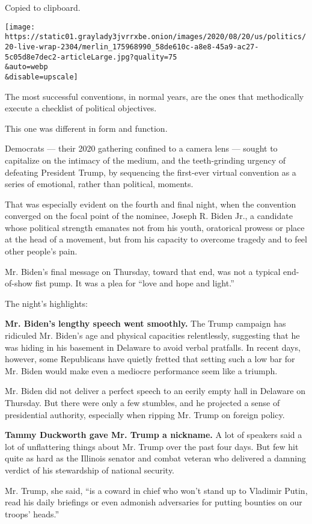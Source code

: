 Copied to clipboard.

\texttt{[image: https://static01.graylady3jvrrxbe.onion/images/2020/08/20/us/politics/20-live-wrap-2304/merlin\_175968990\_58de610c-a8e8-45a9-ac27-5c05d8e7dec2-articleLarge.jpg?quality=75\\\&auto=webp\\\&disable=upscale]}

The most successful conventions, in normal years, are the ones that
methodically execute a checklist of political objectives.

This one was different in form and function.

Democrats --- their 2020 gathering confined to a camera lens --- sought
to capitalize on the intimacy of the medium, and the teeth-grinding
urgency of defeating President Trump, by sequencing the first-ever
virtual convention as a series of emotional, rather than political,
moments.

That was especially evident on the fourth and final night, when the
convention converged on the focal point of the nominee, Joseph R. Biden
Jr., a candidate whose political strength emanates not from his youth,
oratorical prowess or place at the head of a movement, but from his
capacity to overcome tragedy and to feel other people's pain.

Mr. Biden's final message on Thursday, toward that end, was not a
typical end-of-show fist pump. It was a plea for ``love and hope and
light.''

The night's highlights:

\textbf{Mr. Biden's lengthy speech went smoothly.} The Trump campaign
has ridiculed Mr. Biden's age and physical capacities relentlessly,
suggesting that he was hiding in his basement in Delaware to avoid
verbal pratfalls. In recent days, however, some Republicans have quietly
fretted that setting such a low bar for Mr. Biden would make even a
mediocre performance seem like a triumph.

Mr. Biden did not deliver a perfect speech to an eerily empty hall in
Delaware on Thursday. But there were only a few stumbles, and he
projected a sense of presidential authority, especially when ripping Mr.
Trump on foreign policy.

\textbf{Tammy Duckworth gave Mr. Trump a nickname.} A lot of speakers
said a lot of unflattering things about Mr. Trump over the past four
days. But few hit quite as hard as the Illinois senator and combat
veteran who delivered a damning verdict of his stewardship of national
security.

Mr. Trump, she said, ``is a coward in chief who won't stand up to
Vladimir Putin, read his daily briefings or even admonish adversaries
for putting bounties on our troops' heads.''

